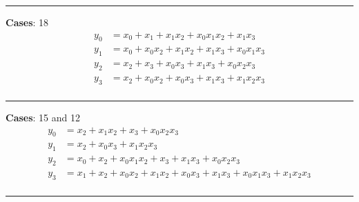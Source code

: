 \begin{minipage}{.8\textwidth}
\hrule
\vspace{2em}
\noindent 

\textbf{Cases}: 18
\begin{align*}
y_0 & = x_0 + x_1 + x_1x_2 + x_0x_1x_2 + x_1x_3 \\
y_1 & = x_0 + x_0x_2 + x_1x_2 + x_1x_3 + x_0x_1x_3 \\
y_2 & = x_2 + x_3 + x_0x_3 + x_1x_3 + x_0x_2x_3 \\
y_3 & = x_2 + x_0x_2 + x_0x_3 + x_1x_3 + x_1x_2x_3 \\
\end{align*}
\vspace{-1em}

\hrule
\vspace{2em}
\noindent 

\textbf{Cases}: 15 and 12
\begin{align*}
y_0 & = x_2 + x_1x_2 + x_3 + x_0x_2x_3 \\
y_1 & = x_2 + x_0x_3 + x_1x_2x_3 \\
y_2 & = x_0 + x_2 + x_0x_1x_2 + x_3 + x_1x_3 + x_0x_2x_3 \\
y_3 & = x_1 + x_2 + x_0x_2 + x_1x_2 + x_0x_3 + x_1x_3 + x_0x_1x_3 + x_1x_2x_3 \\
\end{align*}
\vspace{-1em}

\hrule

\end{minipage}
\newpage %

